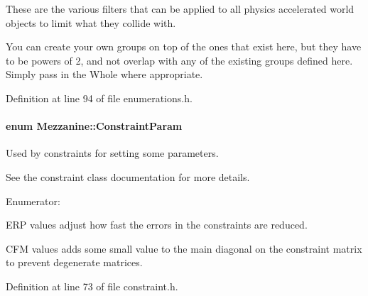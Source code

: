 These are the various filters that can be applied to all physics accelerated world objects to limit what they collide with. 

You can create your own groups on top of the ones that exist here, but they have to be powers of 2, and not overlap with any of the existing groups defined here. Simply pass in the Whole where appropriate. 

Definition at line 94 of file enumerations.h.

\hypertarget{namespaceMezzanine_a6c62e8c2938fb203eb7a7072c12176f4}{
\paragraph[{ConstraintParam}]{\setlength{\rightskip}{0pt plus 5cm}enum {\bf Mezzanine::ConstraintParam}}\hfill}
\label{namespaceMezzanine_a6c62e8c2938fb203eb7a7072c12176f4}


Used by constraints for setting some parameters. 

See the constraint class documentation for more details. \begin{Desc}
\item[Enumerator: ]\par
\begin{description}
\item[{\em 
\hypertarget{namespaceMezzanine_a6c62e8c2938fb203eb7a7072c12176f4aa7c686c7bf5328e60c31d6ab05c3dc90}{
Con\_\-ERP}
\label{namespaceMezzanine_a6c62e8c2938fb203eb7a7072c12176f4aa7c686c7bf5328e60c31d6ab05c3dc90}
}]ERP values adjust how fast the errors in the constraints are reduced. \item[{\em 
\hypertarget{namespaceMezzanine_a6c62e8c2938fb203eb7a7072c12176f4a0ae9de16fc96d34ee601f9516d43b9b8}{
Con\_\-CFM}
\label{namespaceMezzanine_a6c62e8c2938fb203eb7a7072c12176f4a0ae9de16fc96d34ee601f9516d43b9b8}
}]CFM values adds some small value to the main diagonal on the constraint matrix to prevent degenerate matrices. \end{description}
\end{Desc}



Definition at line 73 of file constraint.h.

